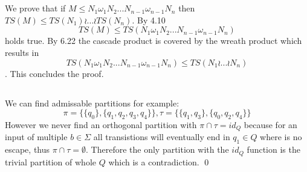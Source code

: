 \documentclass[a4paper,12pt,numbers=noenddot]{scrreport}
\begin{document}

\chapter{}
\section{}
We prove that if $M \leq N_1 \omega_1 N_2 ... N_{n-1}\omega_{n-1} N_n$ then $TS(M) \leq TS(N_1) \wr ... \wr TS(N_n)$.
By 4.10 
$$TS(M) \leq TS(N_1 \omega_1 N_2 ... N_{n-1}\omega_{n-1} N_n)$$ holds true.
By 6.22 the cascade product is covered by the wreath product which results in 
$$TS(N_1 \omega_1 N_2 ... N_{n-1}\omega_{n-1} N_n) \leq TS(N_1 \wr ... \wr N_n)$$.
This concludes the proof.
\section{}
\section{}
\section{}
We can find admissable partitions for example:
$$\pi = \{\{q_0\}, \{q_1, q_2, q_3, q_4\}\}, \tau = \{\{q_1, q_3\}, \{q_0, q_2, q_4\}\}$$
However we never find an orthogonal partition with $\pi \cap \tau = id_Q$ because for an input of multiple $b \in \Sigma$ all transistions will eventually end in $q_1 \in Q$ where is no escape, thus $\pi \cap \tau = \emptyset$.
Therefore the only partition with the $id_Q$ function is the trivial partition of whole $Q$ which is a contradiction.
\qed
\end{document}
